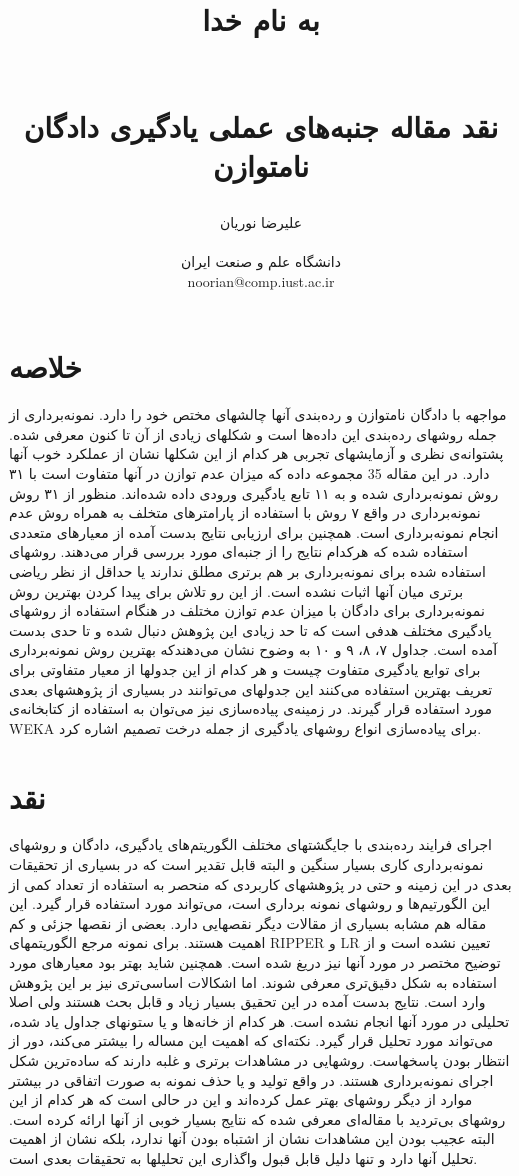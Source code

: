\documentclass{article}
\title{ 
\begin{normalsize} به نام خدا \end{normalsize}
\\[7cm]
نقد مقاله جنبه‌های عملی یادگیری دادگان نامتوازن
\\[3cm]
}
\author{علیرضا نوریان
\\
\\ \small دانشگاه علم و صنعت ایران
\\ \small noorian@comp.iust.ac.ir
}
\begin{document}
\maketitle

\section{خلاصه}
مواجهه با دادگان نامتوازن و رده‌بندی آنها چالشهای مختص خود را دارد. نمونه‌برداری از جمله روشهای رده‌بندی این داده‌ها است و شکلهای زیادی از آن تا کنون معرفی شده. پشتوانه‌ی نظری و آزمایشهای تجربی هر کدام از این شکلها نشان از عملکرد خوب آنها دارد. در این مقاله 35 مجموعه داده که میزان عدم توازن در آنها متفاوت است با  ۳۱ روش نمونه‌برداری شده و به ۱۱ تابع یادگیری ورودی داده شده‌اند. منظور از ۳۱ روش نمونه‌برداری در واقع ۷ روش با استفاده از پارامترهای متخلف به همراه روش عدم انجام نمونه‌برداری است. همچنین برای ارزیابی نتایج بدست آمده از معیارهای متعددی استفاده شده که هرکدام نتایج را از جنبه‌ای مورد بررسی قرار می‌دهند.
روشهای استفاده شده برای نمونه‌برداری بر هم برتری مطلق ندارند یا حداقل از نظر ریاضی برتری میان آنها اثبات نشده است. از این رو تلاش برای پیدا کردن بهترین روش نمونه‌برداری برای دادگان با میزان عدم توازن مختلف در هنگام استفاده از روشهای یادگیری مختلف هدفی است که تا حد زیادی این پژوهش دنبال شده و تا حدی بدست آمده است. جداول ۷، ۸، ۹ و ۱۰ به وضوح نشان می‌دهندکه بهترین روش نمونه‌برداری برای توابع یادگیری متفاوت چیست و هر کدام از این جدولها از معیار متفاوتی برای تعریف بهترین استفاده می‌کنند این جدولهای می‌توانند در بسیاری از پژوهشهای بعدی مورد استفاده قرار گیرند.
در زمینه‌ی پیاده‌سازی نیز می‌توان به استفاده از کتابخانه‌ی WEKA برای پیاده‌سازی انواع روشهای یادگیری از جمله درخت تصمیم اشاره کرد.

\section{نقد}
اجرای فرایند رده‌بندی با جایگشتهای مختلف الگوریتم‌های یادگیری، دادگان و روشهای نمونه‌برداری کاری بسیار سنگین و البته قابل تقدیر است که در بسیاری از تحقیقات بعدی در این زمینه و حتی در پژوهشهای کاربردی که منحصر به استفاده از تعداد کمی از این الگورتیم‌ها و روشهای نمونه برداری است، می‌تواند مورد استفاده قرار گیرد.
این مقاله هم مشابه بسیاری از مقالات دیگر نقصهایی دارد. بعضی از نقصها جزئی و کم اهمیت هستند. برای نمونه مرجع الگوریتمهای RIPPER و LR تعیین نشده است و از توضیح مختصر در مورد آنها نیز دریغ شده است. همچنین شاید بهتر بود معیارهای مورد استفاده به شکل دقیق‌تری معرفی شوند. اما اشکالات اساسی‌تری نیز بر این پژوهش وارد است.
نتایج بدست آمده در این تحقیق بسیار زیاد و قابل بحث هستند ولی اصلا تحلیلی در مورد آنها انجام نشده است. هر کدام از خانه‌ها و یا ستونهای جداول یاد شده، می‌تواند مورد تحلیل قرار گیرد. نکته‌ای که اهمیت این مساله را بیشتر می‌کند، دور از انتظار بودن پاسخهاست. روشهایی در مشاهدات برتری و غلبه دارند که ساده‌ترین شکل اجرای نمونه‌برداری هستند. در واقع تولید و یا حذف نمونه به صورت اتفاقی در بیشتر موارد از دیگر روشهای بهتر عمل کرده‌اند و این در حالی است که هر کدام از این روشهای بی‌تردید با مقاله‌ای معرفی شده که نتایج بسیار خوبی از آنها ارائه کرده است. 
البته عجیب بودن این مشاهدات نشان از اشتباه بودن آنها ندارد، بلکه نشان از اهمیت تحلیل آنها دارد و تنها دلیل قابل قبول واگذاری این تحلیلها به تحقیقات بعدی است.
\end{document}
